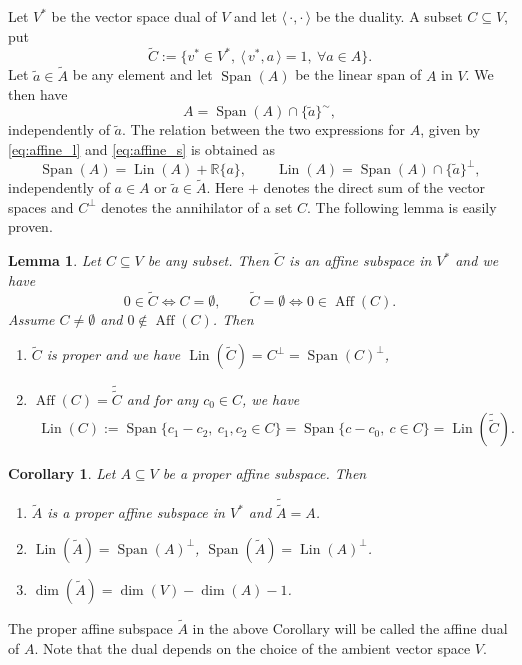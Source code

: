 \documentclass[12pt]{article}
\newtheorem{lemma}{Lemma}
\newtheorem{coro}{Corollary}
\theoremstyle{definition}
\theoremstyle{remark}
\def\aff{\operatorname{Aff}}
\def\lin{\operatorname{Lin}}
\def\Span{\operatorname{Span}}
\def\<{\langle\,}
\def\>{\,\rangle}
\begin{document}
Let $V^*$ be the vector space dual of $V$ and let $\<\cdot,\cdot\>$ be the
duality. A subset $C\subseteq V$, put
\[
\tilde C:=\{v^*\in V^*,\ \<v^*,a\>=1,\ \forall a\in A\}.
\]
Let $\tilde a\in \tilde A$ be any element and let $\Span(A)$ be the linear span of $A$ in
$V$. We then have
\begin{equation}\label{eq:affine_s}
A=\Span(A)\cap \{\tilde a\}^\sim,
\end{equation}
independently of $\tilde a$. The relation between the two expressions for $A$, given by
\eqref{eq:affine_l} and \eqref{eq:affine_s} is obtained as
\[
\Span(A)=\lin(A)+\mathbb R\{a\},\qquad \lin(A)=\Span(A)\cap \{\tilde a\}^\perp,
\]
independently of $a\in A$ or $\tilde a\in \tilde A$. Here $+$ denotes the direct sum of
the vector spaces and $C^\perp$ denotes the annihilator of a set $C$.
The following lemma is  easily proven.

\begin{lemma}\label{lemma:dual} Let $C\subseteq V$ be any subset. Then $\tilde C$ is an affine subspace in 
$V^*$ and we have
\[
0\in \tilde C \iff C= \emptyset, \qquad \tilde C=\emptyset\iff 0\in \aff(C).
\]
Assume $C\ne \emptyset$ and $0\notin \aff(C)$. Then
\begin{enumerate}
\item[(i)] $\tilde C$ is proper and we have $\lin(\tilde C)=C^\perp=\Span(C)^\perp$,
\item[(ii)] $\aff(C)=\tilde{\tilde C}$ and for any $c_0\in
C$, we have
\begin{align*}
\lin(C):= \Span\{c_1-c_2,\ c_1,c_2\in C\}=\Span\{c-c_0,\ c\in C\}=\lin(\tilde{\tilde C}).
\end{align*}

\end{enumerate}


\end{lemma}

\begin{coro}\label{coro:dual} Let $A\subseteq V$ be a proper affine subspace. Then 
\begin{enumerate}
\item[(i)] $\tilde A$ is a proper affine subspace in $V^*$ and $\tilde{\tilde A}=A$.
\item[(ii)] $\lin(\tilde A)=\Span(A)^\perp$, $\Span(\tilde A)=\lin(A)^\perp$.
\item[(iii)] $\dim(\tilde A)=\dim(V)-\dim(A)-1$.
\end{enumerate}


\end{coro}

The proper affine subspace $\tilde A$ in the above Corollary will be called the affine dual
of $A$. Note that the dual depends on the choice of the ambient vector space $V$.
\end{document}

